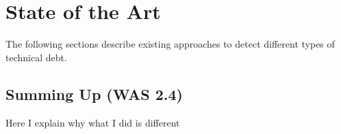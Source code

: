
\chapter{State of the Art}
The following sections describe existing approaches to detect different types of technical debt.






\section{Summing Up (WAS 2.4)}
Here I explain why what I did is different
